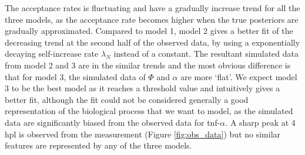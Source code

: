 The acceptance rates is fluctuating and have a gradually increase trend for all the three models, as the acceptance rate becomes higher when the true posteriors are gradually approximated. Compared to model 1, model 2 gives a better fit of the decreasing trend at the second half of the observed data, by using a exponentially decaying self-increase rate $\lambda_N$ instead of a constant. The resultant simulated data from model 2 and 3 are in the similar trends and the most obvious difference is that for model 3, the simulated data of $\Phi$ and $\alpha$ are more `flat'. We expect model 3 to be the best model as it reaches a threshold value and intuitively gives a better fit, although the fit could not be considered generally a good representation of the biological process that we want to model, as the simulated data are significantly biased from the observed data for tnf-$\alpha$. A sharp peak at 4 hpl is observed from the measurement (Figure \ref{fig:obs_data}) but no similar features are represented by any of the three models.

